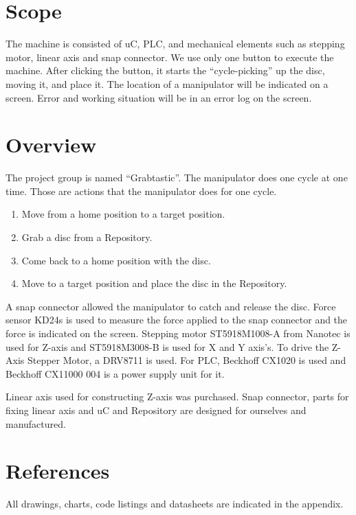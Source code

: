 \documentclass[a4paper,12pt]{scrreprt}
\begin{document}
\section{Scope}

The machine is consisted of \acs{uC}, \acs{PLC}, and mechanical elements such as stepping motor, linear axis and snap connector. We use only one button to execute the machine. After clicking the button, it starts the \enquote{cycle-picking} up the disc, moving it, and place it. The location of a manipulator will be indicated on a screen. Error and working situation will be in an error log on the screen.

\section{Overview}

The project group is named \enquote{Grabtastic}. The manipulator does one cycle at one time. Those are actions that the manipulator does for one cycle.

\begin{enumerate}
\item Move from a home position to a target position.
\item Grab a disc from a \acs{Repository}.
\item Come back to a home position with the disc.
\item Move to a target position and place the disc in the  \acs{Repository}.
\end{enumerate}

A snap connector allowed the manipulator to catch and release the disc. Force sensor KD24s is used to measure the force applied to the snap connector and the force is indicated on the screen.  Stepping motor ST5918M1008-A from Nanotec is used for Z-axis and ST5918M3008-B is used for X and Y axis's. To drive the Z-Axis Stepper Motor, a DRV8711 is used. For \acs{PLC}, Beckhoff CX1020 is used and Beckhoff CX11000 004 is a power supply unit for it.

Linear axis used for constructing Z-axis was purchased. Snap connector, parts for fixing linear axis and \acs{uC} and \acs{Repository} are designed for ourselves and manufactured.


\section{References}

All drawings, charts, code listings and datasheets are indicated in the appendix.
\end{document}
